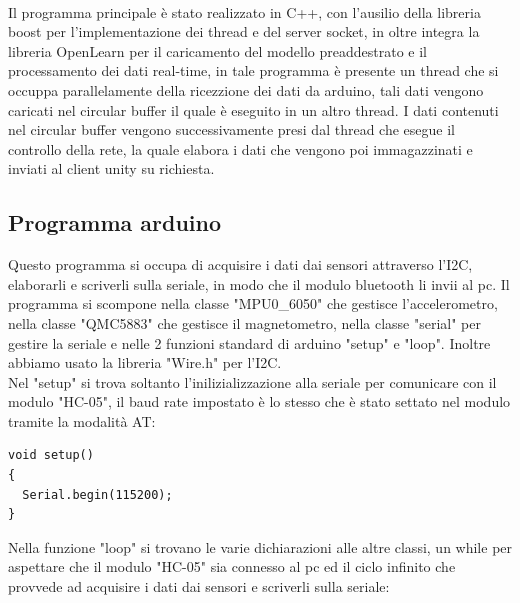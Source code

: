 \documentclass[10pt,a4paper]{article}
\begin{document}
\\
Il programma principale è stato realizzato in C++, con l'ausilio della libreria boost per l'implementazione dei thread e del server socket, in oltre integra la libreria OpenLearn per il caricamento del modello preaddestrato e il processamento dei dati real-time, in tale programma è presente un thread che si occuppa parallelamente della ricezzione dei dati da arduino, tali dati vengono caricati nel circular buffer il quale è eseguito in un altro thread. I dati contenuti nel circular buffer vengono successivamente presi dal thread che esegue il controllo della rete, la quale elabora i dati che vengono poi immagazzinati e inviati al client unity su richiesta. 
\clearpage

\subsection{Programma arduino}
Questo programma si occupa di acquisire i dati dai sensori attraverso l'I2C, elaborarli e scriverli sulla seriale, in modo che il modulo bluetooth li invii al pc. Il programma si scompone nella classe "MPU0\_6050" che gestisce l'accelerometro, nella classe "QMC5883" che gestisce il magnetometro, nella classe "serial" per gestire la seriale e nelle 2 funzioni standard di arduino "setup" e "loop". Inoltre abbiamo usato la libreria "Wire.h" per l'I2C. \\
Nel "setup" si trova soltanto l'inilizializzazione alla seriale per comunicare con il modulo "HC-05", il baud rate impostato \`e lo stesso che \`e stato settato nel modulo tramite la modalit\`a AT:
\begin{lstlisting}[style=myArduino, caption=funzione "setup", captionpos=b]
void setup() 
{
  Serial.begin(115200);
}
\end{lstlisting}
Nella funzione "loop" si trovano le varie dichiarazioni alle altre classi, un while per aspettare che il modulo "HC-05" sia connesso al pc ed il ciclo infinito che provvede ad acquisire i dati dai sensori e scriverli sulla seriale:
\end{document}

